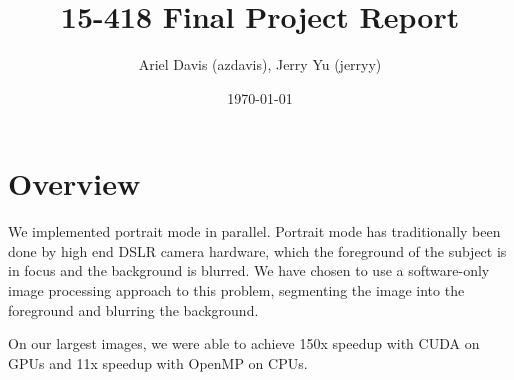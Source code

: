 \documentclass[12pt]{article}
\author{Ariel Davis (azdavis), Jerry Yu (jerryy)}
\date{\today}
\title{15-418 Final Project Report}
\begin{document}
\maketitle

\section{Overview}

We implemented portrait mode in parallel. Portrait mode has traditionally been
done by high end DSLR camera hardware, which the foreground of the subject is
in focus and the background is blurred. We have chosen to use a software-only
image processing approach to this problem, segmenting the image into the
foreground and blurring the background.

On our largest images, we were able to achieve 150x speedup with CUDA on GPUs
and 11x speedup with OpenMP on CPUs.
\end{document}
